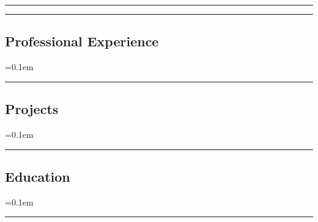 





\hrule
\begin{indentsection}{\parindent}
\begin{description*}
  
  
\end{description*}
\end{indentsection}

\hrule
\vspace{-0.4em}
\subsection*{Professional Experience}
\begin{itemize}
  \parskip=0.1em
  
  
  
\end{itemize}

\hrule
\vspace{-0.4em}
\subsection*{Projects}
\begin{itemize}
  \parskip=0.1em
  
  
  
  
  
  
\end{itemize}

\clearpage

\hrule
\vspace{-0.4em}
\subsection*{Education}
\begin{itemize}
  \parskip=0.1em

  
  
\end{itemize}
\hrule

